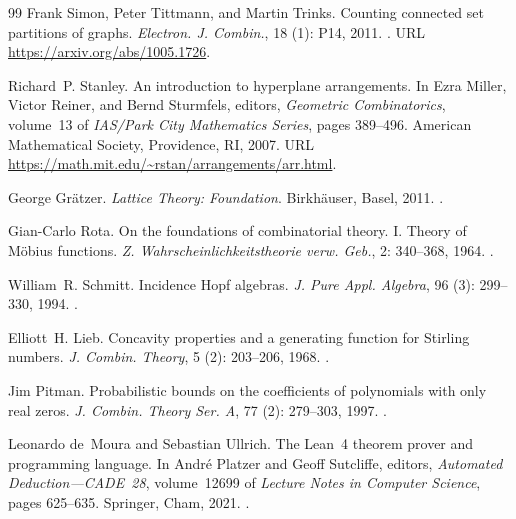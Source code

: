 \documentclass[a4paper,11pt,reqno]{amsart}
\theoremstyle{plain}
\theoremstyle{definition}
\theoremstyle{remark}
\begin{document}
\begin{thebibliography}{99}
Frank Simon, Peter Tittmann, and Martin Trinks.
\newblock Counting connected set partitions of graphs.
\newblock \emph{Electron. J. Combin.}, 18 (1): P14, 2011.
\newblock {}.
\newblock URL \url{https://arxiv.org/abs/1005.1726}.

Richard~P. Stanley.
\newblock An introduction to hyperplane arrangements.
\newblock In Ezra Miller, Victor Reiner, and Bernd Sturmfels, editors,
  \emph{Geometric Combinatorics}, volume~13 of \emph{IAS/Park City
  Mathematics Series}, pages 389--496. American Mathematical Society,
  Providence, RI, 2007.
\newblock URL \url{https://math.mit.edu/~rstan/arrangements/arr.html}.

George Gr{\"a}tzer.
\newblock \emph{Lattice Theory: Foundation}.
\newblock Birkh{\"a}user, Basel, 2011.
\newblock {}.

Gian-Carlo Rota.
\newblock On the foundations of combinatorial theory. I. Theory of
  M\"obius functions.
\newblock \emph{Z. Wahrscheinlichkeitstheorie verw. Geb.}, 2:
  340--368, 1964.
\newblock {}.

William~R. Schmitt.
\newblock Incidence Hopf algebras.
\newblock \emph{J. Pure Appl. Algebra}, 96 (3): 299--330, 1994.
\newblock {}.

Elliott~H. Lieb.
\newblock Concavity properties and a generating function for Stirling numbers.
\newblock \emph{J. Combin. Theory}, 5 (2): 203--206, 1968.
\newblock {}.

Jim Pitman.
\newblock Probabilistic bounds on the coefficients of polynomials with only real zeros.
\newblock \emph{J. Combin. Theory Ser. A}, 77 (2): 279--303, 1997.
\newblock {}.

Leonardo de~Moura and Sebastian Ullrich.
\newblock The Lean~4 theorem prover and programming language.
\newblock In Andr\'e Platzer and Geoff Sutcliffe, editors,
  \emph{Automated Deduction---CADE~28}, volume~12699 of \emph{Lecture
  Notes in Computer Science}, pages 625--635. Springer, Cham, 2021.
\newblock {}.


\end{thebibliography}
\end{document}
